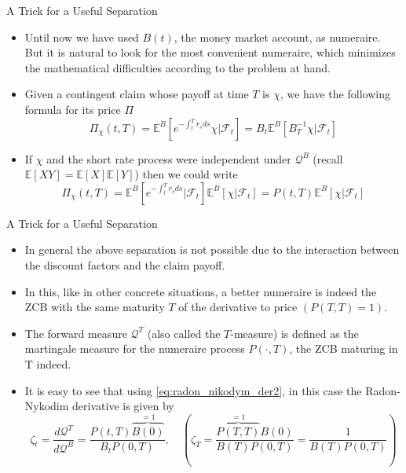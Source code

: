\documentclass{beamer}
\begin{document}
\begin{frame}{A Trick for a Useful Separation}
	\begin{itemize}
	\item Until now we have used $B(t)$, the money market account, as numeraire. But it is natural to look for the most convenient numeraire, which minimizes the mathematical difficulties according to the problem at hand.
	\item Given a contingent claim whose payoff at time $T$ is $\chi$, we have the following formula for its price $\Pi$
	\begin{equation*}
	\Pi_\chi(t,T)=\mathbb{E}^B\left[e^{-\int_t^T r_s ds}\chi\bigg|\mathcal{F}_t \right]=B_t\mathbb{E}^B\left[B^{-1}_T\chi|\mathcal{F}_t\right]
	\end{equation*}
	\item If $\chi$ and the short rate process were independent under $\mathcal{Q}^B$ (recall $\mathbb{E}[XY]=\mathbb{E}[X]\mathbb{E}[Y]$) then we could write
	\begin{equation*}
	\Pi_\chi(t,T)=\mathbb{E}^B\left[e^{-\int_t^T r_s ds}\bigg|\mathcal{F}_t\right]\mathbb{E}^B\left[\chi|\mathcal{F}_t\right] = P(t,T)\mathbb{E}^B\left[\chi|\mathcal{F}_t\right]
	\end{equation*}
	\end{itemize}
\end{frame}

\begin{frame}{A Trick for a Useful Separation}
	\begin{itemize}
		\item In general the above separation is not possible due to the interaction between the discount factors and the claim payoff. 
		\item In this, like in other concrete situations, a better numeraire is indeed the ZCB with the same maturity $T$ of the derivative to price $(P(T,T)=1)$.
		\item The forward measure $\mathcal{Q}^T$ (also called the $T$-measure) is defined as the martingale measure for the numeraire process $P(\cdot,T)$, the ZCB maturing in T indeed.
		\item It is easy to see that using \cref{eq:radon_nikodym_der2}, in this case the Radon-Nykodim derivative is given by
		\begin{equation}
			\zeta_t = \frac{d\mathcal{Q}^T}{d\mathcal{Q}^B} = \frac{P(t,T)\overbrace{B(0)}^{=1}}{B_t P(0,T)} ,\quad\left(\zeta_T=\frac{\overbrace{P(T,T)}^{=1}B(0)}{B(T)P(0,T)}=\frac{1}{B(T)P(0,T)}\right)
		\label{eq:radon_nikodym_t_forward}
		\end{equation}
	\end{itemize}
\end{frame}
\end{document}
